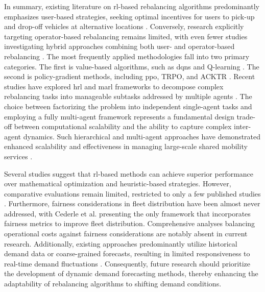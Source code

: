 In summary, existing literature on \gls{rl}-based rebalancing algorithms predominantly emphasizes user-based strategies, seeking optimal incentives for users to pick-up and drop-off vehicles at alternative locations \cite{losapio_smart_2022, cederle_fairness-oriented_2025, pan_deep_2019, schofield_handling_2021, yun_price_2024, duan_optimizing_2019}.
Conversely, research explicitly targeting operator-based rebalancing remains limited, with even fewer studies investigating hybrid approaches combining both user- and operator-based rebalancing \cite{losapio_smart_2022}.
The most frequently applied methodologies fall into two primary categories.
The first is value-based algorithms, such as \glspl{dqn} and Q-learning \cite{li_dynamic_2018, liang_dual_2024, losapio_smart_2022, cederle_fairness-oriented_2025}.
The second is policy-gradient methods, including \gls{ppo}, TRPO, and ACKTR \cite{pan_deep_2019, schofield_handling_2021, yun_price_2024, duan_optimizing_2019}.
Recent studies have explored \gls{hrl} and \gls{marl} frameworks to decompose complex rebalancing tasks into manageable subtasks addressed by multiple agents \cite{cederle_fairness-oriented_2025}.
The choice between factorizing the problem into independent single-agent tasks and employing a fully multi-agent framework represents a fundamental design trade-off between computational scalability and the ability to capture complex inter-agent dynamics.
Such hierarchical and multi-agent approaches have demonstrated enhanced scalability and effectiveness in managing large-scale shared mobility services \cite{schofield_handling_2021, pan_deep_2019}.

Several studies suggest that \gls{rl}-based methods can achieve superior performance over mathematical optimization and heuristic-based strategies.
However, comparative evaluations remain limited, restricted to only a few published studies \cite{li_dynamic_2018, pan_deep_2019, liang_dual_2024}.
Furthermore, fairness considerations in fleet distribution have been almost never addressed, with Cederle et al. \cite{cederle_fairness-oriented_2025} presenting the only framework that incorporates fairness metrics to improve fleet distribution.
Comprehensive analyses balancing operational costs against fairness considerations are notably absent in current research.
Additionally, existing approaches predominantly utilize historical demand data or coarse-grained forecasts, resulting in limited responsiveness to real-time demand fluctuations \cite{li_dynamic_2018, pan_deep_2019, xie_censored_2023, schofield_handling_2021}.
Consequently, future research should prioritize the development of dynamic demand forecasting methods, thereby enhancing the adaptability of rebalancing algorithms to shifting demand conditions.
\\

